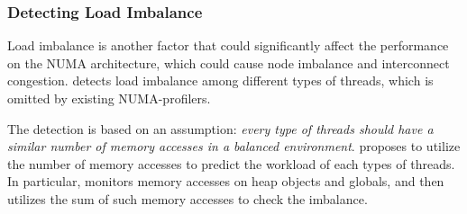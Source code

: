 \subsubsection{Detecting Load Imbalance}
\label{sec:loadimbalance}

Load imbalance is another factor that could significantly affect the performance on the NUMA architecture, which could cause node imbalance and interconnect congestion. \NP{} detects load imbalance among different types of threads, which is omitted by existing NUMA-profilers.  %



The detection is based on an assumption: \textit{every type of threads should have a similar number of memory accesses in a balanced environment}. \NP{} proposes to utilize the number of memory accesses to predict the workload of each types of threads. In particular, \NP{} monitors memory accesses on heap objects and globals, and then utilizes the sum of such memory accesses to check the imbalance. 




